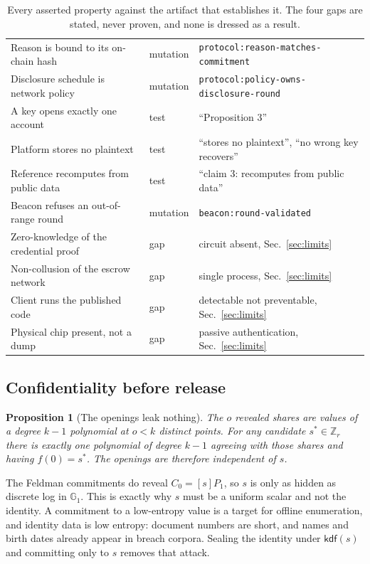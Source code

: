 \documentclass[11pt,a4paper]{article}
\newtheorem{proposition}{Proposition}
\begin{document}
\begin{table}[h]
\begin{tabular}{p{5.0cm}p{1.6cm}p{5.0cm}}
Reason is bound to its on-chain hash & mutation &
  \texttt{protocol:reason-matches-commitment} \\
Disclosure schedule is network policy & mutation &
  \texttt{protocol:policy-owns-\allowbreak disclosure-round} \\
A key opens exactly one account & test &
  ``Proposition 3'' \\
Platform stores no plaintext & test &
  ``stores no plaintext'', ``no wrong key recovers'' \\
Reference recomputes from public data & test &
  ``claim 3: recomputes from public data'' \\
Beacon refuses an out-of-range round & mutation &
  \texttt{beacon:round-validated} \\
\midrule
Zero-knowledge of the credential proof & gap &
  circuit absent, Sec.~\ref{sec:limits} \\
Non-collusion of the escrow network & gap &
  single process, Sec.~\ref{sec:limits} \\
Client runs the published code & gap &
  detectable not preventable, Sec.~\ref{sec:limits} \\
Physical chip present, not a dump & gap &
  passive authentication, Sec.~\ref{sec:limits} \\
\bottomrule
\end{tabular}
\caption{Every asserted property against the artifact that establishes it. The
four gaps are stated, never proven, and none is dressed as a result.}
\label{tab:claims}
\end{table}

\subsection{Confidentiality before release}

\begin{proposition}[The openings leak nothing]
The $o$ revealed shares are values of a degree $k{-}1$ polynomial at $o < k$
distinct points. For any candidate $s^{*} \in \mathbb{Z}_r$ there is exactly one
polynomial of degree $k{-}1$ agreeing with those shares and having
$f(0) = s^{*}$. The openings are therefore independent of $s$.
\end{proposition}

The Feldman commitments do reveal $C_0 = [s]P_1$, so $s$ is only as hidden as
discrete log in $\mathbb{G}_1$. This is exactly why $s$ must be a uniform scalar
and not the identity. A commitment to a low-entropy value is a target for offline
enumeration, and identity data is low entropy: document numbers are short, and
names and birth dates already appear in breach corpora. Sealing the identity
under $\mathsf{kdf}(s)$ and committing only to $s$ removes that attack.
\end{document}
